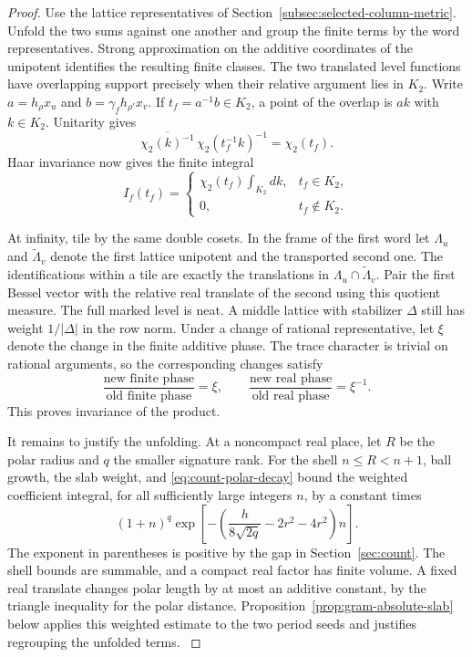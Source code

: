 \begin{proof}
Use the lattice representatives of Section~\ref{subsec:selected-column-metric}.
Unfold the two sums against one another and group the finite terms by
the word representatives. Strong approximation on the additive
coordinates of the unipotent identifies the resulting finite classes.
The two translated level functions have overlapping support precisely
when their relative argument lies in \(K_2\). Write \(a=h_\rho x_u\) and \(b=\gamma_f h_{\rho'}x_v\).
If \(t_f=a^{-1}b\in K_2\), a point of the overlap is \(ak\)
with \(k\in K_2\). Unitarity gives
\[
 \overline{\chi_2(k)^{-1}}\,\chi_2(t_f^{-1}k)^{-1}
       =\chi_2(t_f).
\]
Haar invariance now gives the finite integral
\[
 I_f(t_f)=
 \begin{cases}
    \chi_2(t_f)\displaystyle\int_{K_2} dk,&t_f\in K_2,\\
    0,&t_f\notin K_2 .
 \end{cases}
\]

At infinity, tile by the same double cosets. In the frame of the first word let \(\Lambda_u\) and
\(\widetilde\Lambda_v\) denote the first lattice unipotent and
the transported second one. The identifications within a tile are
exactly the translations in \(\Lambda_u\cap\widetilde\Lambda_v\).
Pair the first Bessel vector with the relative real translate of the
second using this quotient measure. The full marked level is neat. A middle lattice
with stabilizer \(\Delta\) still has weight \(1/|\Delta|\) in the row
norm. Under a change of rational representative, let \(\xi\) denote
the change in the finite additive phase. The trace character is
trivial on rational arguments, so the corresponding changes satisfy
\[
 \frac{\text{new finite phase}}{\text{old finite phase}}=\xi,
 \qquad
 \frac{\text{new real phase}}{\text{old real phase}}=\xi^{-1}.
\]
This proves invariance of the product.

It remains to justify the unfolding. At a noncompact real place,
let \(R\) be the polar radius and \(q\) the smaller signature rank.
For the shell \(n\le R<n+1\), ball growth, the slab weight, and
\eqref{eq:count-polar-decay} bound the weighted coefficient integral,
for all sufficiently large integers \(n\), by a constant times
\[
 (1+n)^q
 \exp\!\left[-\left(\frac{h}{8\sqrt{2q}}-2r^2-4r^2\right)n\right].
\]
The exponent in parentheses is positive by the gap in
Section~\ref{sec:count}. The shell bounds are summable, and a compact real factor has
finite volume. A fixed real translate changes polar length by at most
an additive constant, by the triangle inequality for the polar
distance. Proposition~\ref{prop:gram-absolute-slab} below applies
this weighted estimate to the two period seeds and justifies
regrouping the unfolded terms. \cite{companion-row-count}\label{cor:selected-row-gram-2}

\end{proof}

